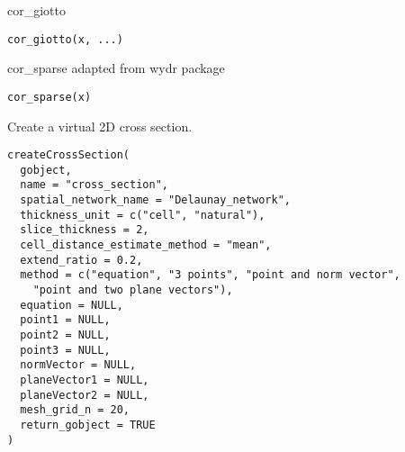 \documentclass[a4paper]{book}
\begin{document}
%
\begin{Description}\relax
cor\_giotto
\end{Description}
%
\begin{Usage}
\begin{verbatim}
cor_giotto(x, ...)
\end{verbatim}
\end{Usage}
%
\begin{Description}\relax
cor\_sparse adapted from wydr package
\end{Description}
%
\begin{Usage}
\begin{verbatim}
cor_sparse(x)
\end{verbatim}
\end{Usage}
%
\begin{Description}\relax
Create a virtual 2D cross section.
\end{Description}
%
\begin{Usage}
\begin{verbatim}
createCrossSection(
  gobject,
  name = "cross_section",
  spatial_network_name = "Delaunay_network",
  thickness_unit = c("cell", "natural"),
  slice_thickness = 2,
  cell_distance_estimate_method = "mean",
  extend_ratio = 0.2,
  method = c("equation", "3 points", "point and norm vector",
    "point and two plane vectors"),
  equation = NULL,
  point1 = NULL,
  point2 = NULL,
  point3 = NULL,
  normVector = NULL,
  planeVector1 = NULL,
  planeVector2 = NULL,
  mesh_grid_n = 20,
  return_gobject = TRUE
)
\end{verbatim}
\end{Usage}
%
\end{document}

